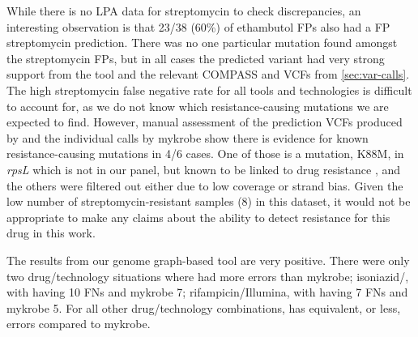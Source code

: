 While there is no LPA data for streptomycin to check discrepancies, an interesting observation is that 23/38 (60\%) of ethambutol FPs also had a FP streptomycin prediction. There was no one particular mutation found amongst the streptomycin FPs, but in all cases the predicted variant had very strong support from the tool and the relevant COMPASS and \bcftools{} VCFs from \autoref{sec:var-calls}. The high streptomycin false negative rate for all tools and technologies is difficult to account for, as we do not know which resistance-causing mutations we are expected to find. However, manual assessment of the prediction VCFs produced by \drprg{} and the individual calls by mykrobe show there is evidence for known resistance-causing mutations in 4/6 cases. One of those is a mutation, K88M, in \textit{rpsL} which is not in our panel, but known to be linked to drug resistance \cite{Smittipat2016}, and the others were filtered out either due to low coverage or strand bias. Given the low number of streptomycin-resistant samples (8) in this dataset, it would not be appropriate to make any claims about the ability to detect resistance for this drug in this work.

The results from our genome graph-based tool \drprg{} are very positive. There were only two drug/technology situations where \drprg{} had more errors than mykrobe; isoniazid/\ont{}, with \drprg{} having 10 FNs and mykrobe 7; rifampicin/Illumina, with \drprg{} having 7 FNs and mykrobe 5. For all other drug/technology combinations, \drprg{} has equivalent, or less, errors compared to mykrobe.

